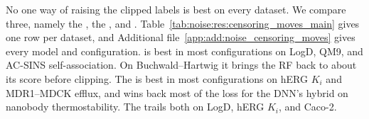 No one way of raising the clipped labels is best on every dataset. We compare three, namely the , the , and . Table~\ref{tab:noise:res:censoring_moves_main} gives one row per dataset, and Additional file~\ref{app:add:noise_censoring_moves} gives every model and configuration.  is best in most configurations on LogD, QM9, and AC-SINS self-association. On Buchwald--Hartwig it brings the RF back to about its score before clipping. The  is best in most configurations on hERG $K_i$ and MDR1--MDCK efflux, and wins back most of the loss for the DNN's hybrid on nanobody thermostability. The  trails both on LogD, hERG $K_i$, and Caco-2.

